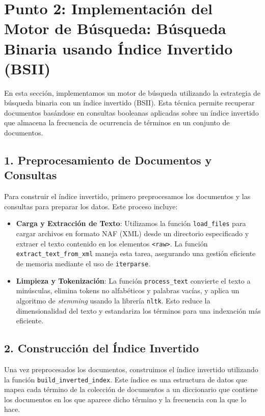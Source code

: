 \documentclass[11pt,english]{article}
\theoremstyle{plain}
\begin{document}
\section*{Punto 2: Implementación del Motor de Búsqueda: Búsqueda Binaria usando Índice Invertido (BSII)}

En esta sección, implementamos un motor de búsqueda utilizando la estrategia de búsqueda binaria con un índice invertido (BSII). Esta técnica permite recuperar documentos basándose en consultas booleanas aplicadas sobre un índice invertido que almacena la frecuencia de ocurrencia de términos en un conjunto de documentos.

\subsection*{1. Preprocesamiento de Documentos y Consultas}

Para construir el índice invertido, primero preprocesamos los documentos y las consultas para preparar los datos. Este proceso incluye:

\begin{itemize}
    \item \textbf{Carga y Extracción de Texto}: Utilizamos la función \texttt{load\_files} para cargar archivos en formato NAF (XML) desde un directorio especificado y extraer el texto contenido en los elementos \texttt{<raw>}. La función \texttt{extract\_text\_from\_xml} maneja esta tarea, asegurando una gestión eficiente de memoria mediante el uso de \texttt{iterparse}.
    \item \textbf{Limpieza y Tokenización}: La función \texttt{process\_text} convierte el texto a minúsculas, elimina tokens no alfabéticos y palabras vacías, y aplica un algoritmo de \textit{stemming} usando la librería \texttt{nltk}. Esto reduce la dimensionalidad del texto y estandariza los términos para una indexación más eficiente.
\end{itemize}

\subsection*{2. Construcción del Índice Invertido}

Una vez preprocesados los documentos, construimos el índice invertido utilizando la función \texttt{build\_inverted\_index}. Este índice es una estructura de datos que mapea cada término de la colección de documentos a un diccionario que contiene los documentos en los que aparece dicho término y la frecuencia con la que lo hace.
\end{document}
